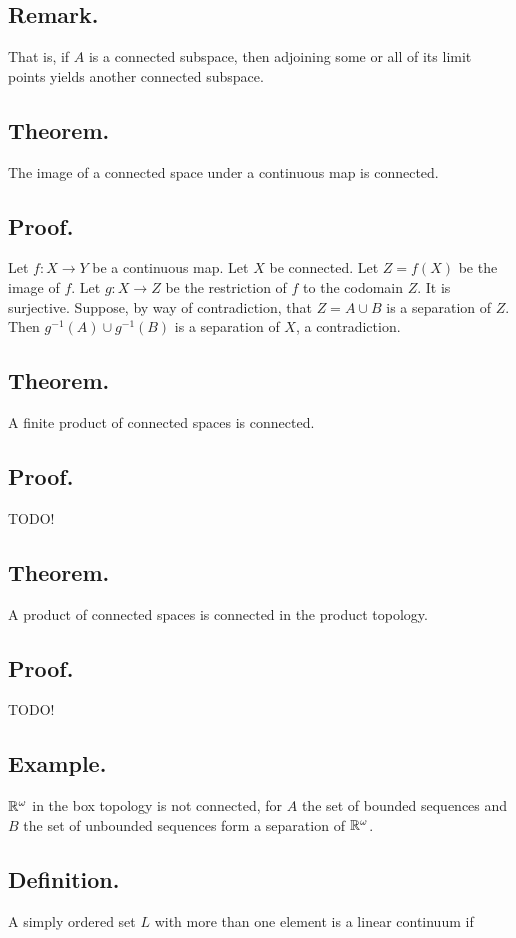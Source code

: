 \documentclass[titlepage]{article}
\begin{document}
\subsection{Remark.} That is, if $A$ is a connected subspace, then adjoining some or all of its limit points yields another connected subspace.

\subsection{Theorem.} The image of a connected space under a continuous map is connected.

\subsection{Proof.} Let $f: X \to Y$ be a continuous map. Let $X$ be connected. Let $Z = f(X)$ be the image of $f$. Let $g: X \to Z$ be the restriction of $f$ to the codomain $Z$. It is surjective. Suppose, by way of contradiction, that $Z = A \cup B$ is a separation of $Z$. Then $g^{-1}(A) \cup g^{-1}(B)$ is a separation of $X$, a contradiction.

\subsection{Theorem.} A finite product of connected spaces is connected.

\subsection{Proof.} TODO!

\subsection{Theorem.} A product of connected spaces is connected in the product topology.

\subsection{Proof.} TODO!

\subsection{Example.} $\mathbb{R}^{\omega}$ in the box topology is not connected, for $A$ the set of bounded sequences and $B$ the set of unbounded sequences form a separation of $\mathbb{R}^{\omega}$.

\subsection{Definition.} A simply ordered set $L$ with more than one element is a linear continuum if 
\end{document}
